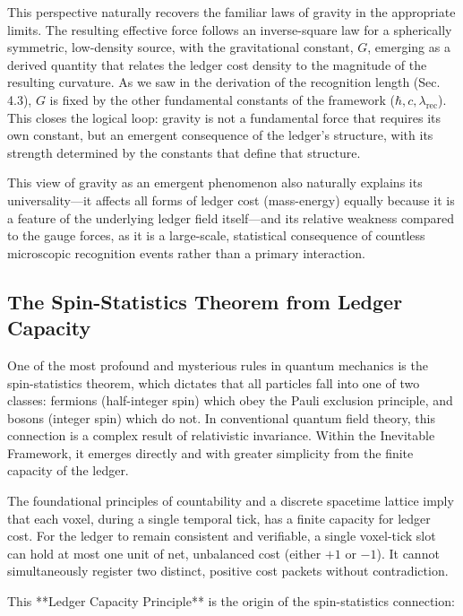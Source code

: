 \documentclass[11pt,a4paper]{article}
\begin{document}
This perspective naturally recovers the familiar laws of gravity in the appropriate limits. The resulting effective force follows an inverse-square law for a spherically symmetric, low-density source, with the gravitational constant, \(G\), emerging as a derived quantity that relates the ledger cost density to the magnitude of the resulting curvature. As we saw in the derivation of the recognition length (Sec. 4.3), \(G\) is fixed by the other fundamental constants of the framework (\(\hbar, c, \lambda_{\text{rec}}\)). This closes the logical loop: gravity is not a fundamental force that requires its own constant, but an emergent consequence of the ledger's structure, with its strength determined by the constants that define that structure.

This view of gravity as an emergent phenomenon also naturally explains its universality—it affects all forms of ledger cost (mass-energy) equally because it is a feature of the underlying ledger field itself—and its relative weakness compared to the gauge forces, as it is a large-scale, statistical consequence of countless microscopic recognition events rather than a primary interaction.

\subsection{The Spin-Statistics Theorem from Ledger Capacity}
One of the most profound and mysterious rules in quantum mechanics is the spin-statistics theorem, which dictates that all particles fall into one of two classes: fermions (half-integer spin) which obey the Pauli exclusion principle, and bosons (integer spin) which do not. In conventional quantum field theory, this connection is a complex result of relativistic invariance. Within the Inevitable Framework, it emerges directly and with greater simplicity from the finite capacity of the ledger.

The foundational principles of countability and a discrete spacetime lattice imply that each voxel, during a single temporal tick, has a finite capacity for ledger cost. For the ledger to remain consistent and verifiable, a single voxel-tick slot can hold at most one unit of net, unbalanced cost (either \(+1\) or \(-1\)). It cannot simultaneously register two distinct, positive cost packets without contradiction.

This **Ledger Capacity Principle** is the origin of the spin-statistics connection:
\end{document}
